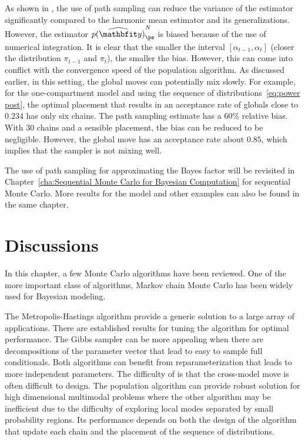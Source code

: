 As shown in \cite{Calderhead:2009bd}, the use of path sampling can reduce the
variance of the estimator significantly compared to the harmonic mean
estimator and its generalizations. However, the estimator
$\widehat{p(\data)}_{\ps}^N$ is biased because of the use of numerical
integration. It is clear that the smaller the interval
$[\alpha_{t-1},\alpha_t]$ (closer the distribution $\pi_{t-1}$ and $\pi_t$),
the smaller the bias. However, this can come into conflict with the
convergence speed of the population \mcmc algorithm. As discussed earlier, in
this setting, the global moves can potentially mix slowly. For example, for
the one-compartment \pet model and using the sequence of
distributions~\eqref{eq:power post}, the optimal placement that results in an
acceptance rate of globals close to $0.234$ has only six chains. The path
sampling estimate has a 60\% relative bias. With 30 chains and a sensible
placement, the bias can be reduced to be negligible. However, the global move
has an acceptance rate about $0.85$, which implies that the sampler is not
mixing well.

The use of path sampling for approximating the Bayes factor will be revisited
in Chapter~\ref{cha:Sequential Monte Carlo for Bayesian Computation} for
sequential Monte Carlo. More results for the \pet model and other examples can
also be found in the same chapter.

\section{Discussions}
\label{sec:Monte Carlo Discussion}

In this chapter, a few Monte Carlo algorithms have been reviewed. One of the
more important class of algorithms, Markov chain Monte Carlo has been widely
used for Bayesian modeling.

The Metropolis-Hastings algorithm provide a generic solution to a large array
of applications. There are established results for tuning the algorithm for
optimal performance. The Gibbs sampler can be more appealing when there are
decompositions of the parameter vector that lead to easy to sample full
conditionals. Both algorithms can benefit from reparameterization that leads
to more independent parameters. The difficulty of \rjmcmc is that the
cross-model move is often difficult to design. The population \mcmc algorithm
can provide robust solution for high dimensional multimodal problems where the
other algorithm may be inefficient due to the difficulty of exploring local
modes separated by small probability regions. Its performance depends on both
the design of the \mcmc algorithm that update each chain and the placement of
the sequence of distributions.

